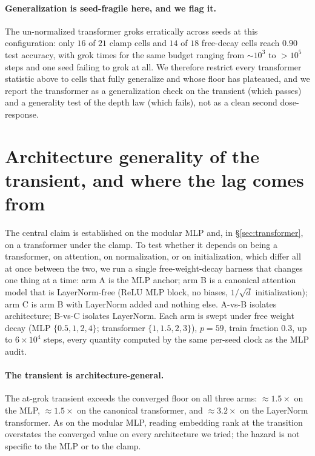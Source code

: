 \documentclass[11pt]{article}
\begin{document}
\paragraph{Generalization is seed-fragile here, and we flag it.} The un-normalized transformer groks
erratically across seeds at this configuration: only $16$ of $21$ clamp cells and $14$ of $18$ free-decay
cells reach $0.90$ test accuracy, with grok times for the same budget ranging from $\sim\!10^3$ to
$>\!10^5$ steps and one seed failing to grok at all. We therefore restrict every transformer statistic
above to cells that fully generalize and whose floor has plateaued, and we report the transformer as a
generalization check on the transient (which passes) and a generality test of the depth law (which
fails), not as a clean second dose-response.

\section{Architecture generality of the transient, and where the lag comes from}
\label{sec:arch}
The central claim is established on the modular MLP and, in \S\ref{sec:transformer}, on a transformer
under the clamp. To test whether it depends on being a transformer, on attention, on
normalization, or on initialization, which differ all at once between the two, we run a single
free-weight-decay harness that changes one thing at a time: arm A is the MLP anchor; arm B is a canonical
attention model that is LayerNorm-free (ReLU MLP block, no biases, $1/\sqrt{d}$ initialization); arm C is
arm B with LayerNorm added and nothing else. A-vs-B isolates architecture; B-vs-C isolates LayerNorm.
Each arm is swept under free weight decay (MLP $\{0.5,1,2,4\}$; transformer $\{1,1.5,2,3\}$), $p=59$,
train fraction $0.3$, up to $6\times10^4$ steps, every quantity computed by the same per-seed clock as the
MLP audit.

\paragraph{The transient is architecture-general.} The at-grok transient exceeds the converged floor on
all three arms: $\approx\!1.5\times$ on the MLP, $\approx\!1.5\times$ on the canonical transformer, and
$\approx\!3.2\times$ on the LayerNorm transformer. As on the modular MLP, reading embedding rank at the
transition overstates the converged value on every architecture we tried; the hazard is not specific to
the MLP or to the clamp.
\end{document}
